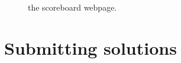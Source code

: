 \begin{figure}[p]
  \centering
  \caption{the scoreboard webpage.}
  \label{fig:team-scoreboard}
\end{figure}

\newpage

\section{Submitting solutions}\label{submit}

